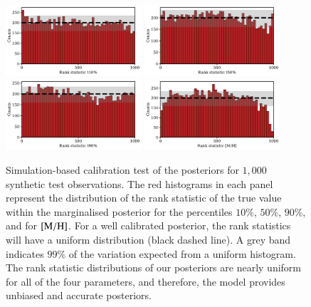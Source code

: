 



\begin{figure}[h!]
    \centering
    
    \includegraphics[width=0.45\textwidth]{images/sbc/rank_statisitic_1.pdf}
    \includegraphics[width=0.45\textwidth]{images/sbc/rank_statisitic_2.pdf}
    \includegraphics[width=0.45\textwidth]{images/sbc/rank_statisitic_3.pdf}
    \includegraphics[width=0.45\textwidth]{images/sbc/rank_statisitic_4.pdf}
    
    
    
    \caption{Simulation-based calibration test of the posteriors for $1{,}000$ synthetic test observations. The red histograms in each panel represent the distribution of the rank statistic of the true value within the marginalised posterior for the percentiles $10\%$, $50\%$, $90\%$, and for $\rm{[M/H]}$. For a well calibrated posterior, the rank statistics will have a uniform distribution (black dashed line). A grey band indicates $99\%$ of the variation expected from a uniform histogram. The rank statistic distributions of our posteriors are nearly uniform for all of the four parameters, and therefore, the model provides unbiased and accurate posteriors.}

    \label{ranks}
\end{figure}


